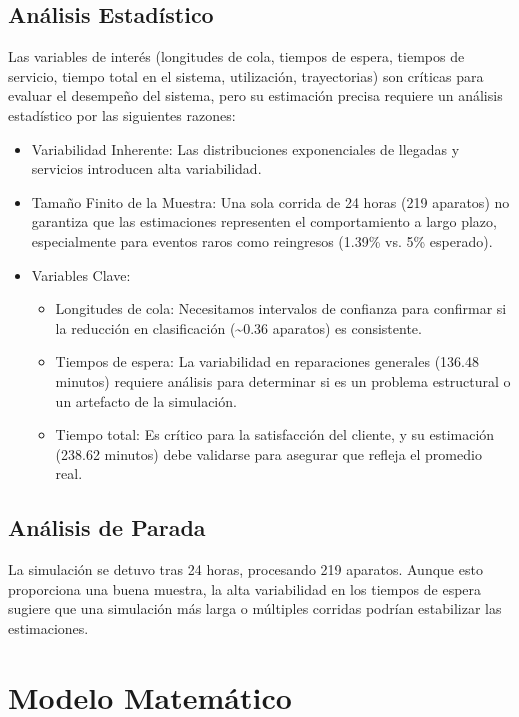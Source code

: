 \documentclass[12pt]{article}
\begin{document}
\subsection{Análisis Estadístico}
Las variables de interés (longitudes de cola, tiempos de espera, tiempos de servicio, tiempo total en el sistema, utilización, trayectorias) son críticas para evaluar el desempeño del sistema, pero su estimación precisa requiere un análisis estadístico por las siguientes razones:
\begin{itemize}
    \item Variabilidad Inherente: Las distribuciones exponenciales de llegadas y servicios introducen alta variabilidad.
    \item Tamaño Finito de la Muestra: Una sola corrida de 24 horas (219 aparatos) no garantiza que las estimaciones representen el comportamiento a largo plazo, especialmente para eventos raros como reingresos (1.39\% vs. 5\% esperado).
    \item Variables Clave:
    \begin{itemize}
        \item Longitudes de cola: Necesitamos intervalos de confianza para confirmar si la reducción en clasificación (\textasciitilde 0.36 aparatos) es consistente.
        \item Tiempos de espera: La variabilidad en reparaciones generales (136.48 minutos) requiere análisis para determinar si es un problema estructural o un artefacto de la simulación.
        \item Tiempo total: Es crítico para la satisfacción del cliente, y su estimación (238.62 minutos) debe validarse para asegurar que refleja el promedio real.
    \end{itemize}
\end{itemize}

\subsection{Análisis de Parada}
La simulación se detuvo tras 24 horas, procesando 219 aparatos. Aunque esto proporciona una buena muestra, la alta variabilidad en los tiempos de espera sugiere que una simulación más larga o múltiples corridas podrían estabilizar las estimaciones.

\section{Modelo Matemático}
\end{document}
